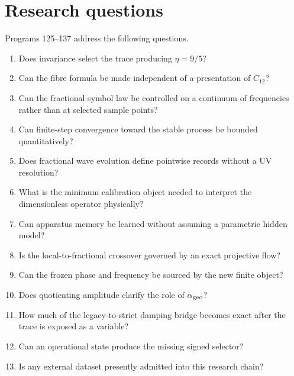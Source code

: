 \documentclass[11pt,a4paper,openany]{report}
\begin{document}
\section{Research questions}

Programs 125--137 address the following questions.

\begin{enumerate}
\item 
Does invariance select the trace producing \(\eta=9/5\)?

\item 
Can the fibre formula be made independent of a presentation of \(C_{12}\)?

\item 
Can the fractional symbol law be controlled on a continuum of frequencies rather than at selected sample points?

\item 
Can finite-step convergence toward the stable process be bounded quantitatively?

\item 
Does fractional wave evolution define pointwise records without a UV resolution?

\item 
What is the minimum calibration object needed to interpret the dimensionless operator physically?

\item 
Can apparatus memory be learned without assuming a parametric hidden model?

\item 
Is the local-to-fractional crossover governed by an exact projective flow?

\item 
Can the frozen phase and frequency be sourced by the new finite object?

\item 
Does quotienting amplitude clarify the role of \(\alpha_{\rm geo}\)?

\item 
How much of the legacy-to-strict damping bridge becomes exact after the trace is exposed as a variable?

\item 
Can an operational state produce the missing signed selector?

\item 
Is any external dataset presently admitted into this research chain?

\end{enumerate}
\end{document}
